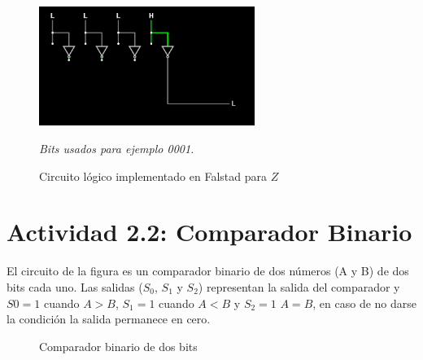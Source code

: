 \begin{figure}[h!]
    \centering
    \includegraphics[width=7cm]{imagenes/2.1_Z.png}
    \caption{Circuito lógico implementado en Falstad para $Z$}
    \label{fig:falstad}
    \footnotesize\textit{Bits usados para ejemplo 0001.}
\end{figure}



\saltoPag

\section{Actividad 2.2: Comparador Binario}

El circuito de la figura es un comparador binario de dos números (A y B) de dos bits cada uno. Las
salidas ($S_0$, $S_1$ y $S_2$) representan la salida del comparador y $S0=1$ cuando $A>B$, $S_1= 1$ cuando $A < B$ y
$S_2=1$ $A=B$, en caso de no darse la condición la salida permanece en cero.

\begin{figure}[h!]
    \centering
    \caption{Comparador binario de dos bits}
\end{figure}

